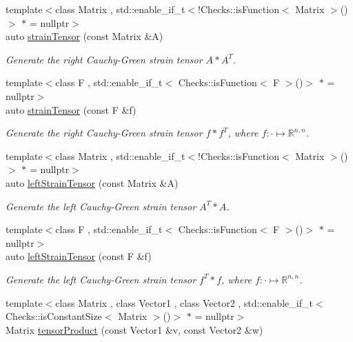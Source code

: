 \begin{DoxyCompactItemize}
{\footnotesize template$<$class Matrix , std\-::enable\-\_\-if\-\_\-t$<$!\-Checks\-::is\-Function$<$ Matrix $>$()$>$ $\ast$  = nullptr$>$ }\\auto \hyperlink{namespaceFunG_1_1LinearAlgebra_a0e10030a723fad88f5f4f0b6612c393a}{strain\-Tensor} (const \-Matrix \&\-A)
\begin{DoxyCompactList}\small\item\em \-Generate the right \-Cauchy-\/\-Green strain tensor $A*A^T$. \end{DoxyCompactList}\item 
{\footnotesize template$<$class F , std\-::enable\-\_\-if\-\_\-t$<$ Checks\-::is\-Function$<$ F $>$()$>$ $\ast$  = nullptr$>$ }\\auto \hyperlink{namespaceFunG_1_1LinearAlgebra_ab4371788da401ca62a3a29a13cf8d4ce}{strain\-Tensor} (const \-F \&f)
\begin{DoxyCompactList}\small\item\em \-Generate the right \-Cauchy-\/\-Green strain tensor $f*f^T$, where $f:\cdot\mapsto\mathbb{R}^{n,n} $. \end{DoxyCompactList}\item 
{\footnotesize template$<$class Matrix , std\-::enable\-\_\-if\-\_\-t$<$!\-Checks\-::is\-Function$<$ Matrix $>$()$>$ $\ast$  = nullptr$>$ }\\auto \hyperlink{namespaceFunG_1_1LinearAlgebra_a5876e082c6e15e8e9a985a855dc698d5}{left\-Strain\-Tensor} (const \-Matrix \&\-A)
\begin{DoxyCompactList}\small\item\em \-Generate the left \-Cauchy-\/\-Green strain tensor $A^T*A$. \end{DoxyCompactList}\item 
{\footnotesize template$<$class F , std\-::enable\-\_\-if\-\_\-t$<$ Checks\-::is\-Function$<$ F $>$()$>$ $\ast$  = nullptr$>$ }\\auto \hyperlink{namespaceFunG_1_1LinearAlgebra_a4ed7509f976a86c83048609da5e8bac7}{left\-Strain\-Tensor} (const \-F \&f)
\begin{DoxyCompactList}\small\item\em \-Generate the left \-Cauchy-\/\-Green strain tensor $f^T*f$, where $f:\cdot\mapsto\mathbb{R}^{n,n} $. \end{DoxyCompactList}\item 
{\footnotesize template$<$class Matrix , class Vector1 , class Vector2 , std\-::enable\-\_\-if\-\_\-t$<$ Checks\-::is\-Constant\-Size$<$ Matrix $>$()$>$ $\ast$  = nullptr$>$ }\\\-Matrix \hyperlink{group__LinearAlgebraGroup_ga5d0e066e6184fb3324d96d20087b5578}{tensor\-Product} (const \-Vector1 \&v, const \-Vector2 \&w)

\end{DoxyCompactItemize}
